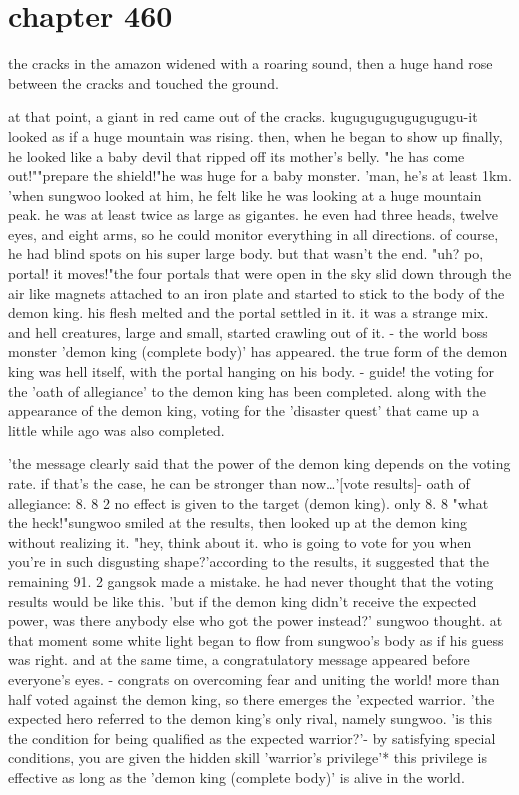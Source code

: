 \section{chapter 460}

the cracks in the amazon widened with a roaring sound, then a huge hand rose between the cracks and touched the ground.





at that point, a giant in red came out of the cracks.
kugugugugugugugugu-it looked as if a huge mountain was rising.
 then, when he began to show up finally, he looked like a baby devil that ripped off its mother's belly.
"he has come out!""prepare the shield!"he was huge for a baby monster.
'man, he's at least 1km.
'when sungwoo looked at him, he felt like he was looking at a huge mountain peak.
he was at least twice as large as gigantes.
 he even had three heads, twelve eyes, and eight arms, so he could monitor everything in all directions.
of course, he had blind spots on his super large body.
but that wasn't the end.
"uh? po, portal! it moves!"the four portals that were open in the sky slid down through the air like magnets attached to an iron plate and started to stick to the body of the demon king.
 his flesh melted and the portal settled in it.
 it was a strange mix.
and hell creatures, large and small, started crawling out of it.
- the world boss monster 'demon king (complete body)' has appeared.
the true form of the demon king was hell itself, with the portal hanging on his body.
- guide! the voting for the 'oath of allegiance' to the demon king has been completed.
along with the appearance of the demon king, voting for the 'disaster quest' that came up a little while ago was also completed.

'the message clearly said that the power of the demon king depends on the voting rate.
 if that's the case, he can be stronger than now…'[vote results]- oath of allegiance: 8.
8%
2%
 no effect is given to the target (demon king).
only 8.
8%
"what the heck!"sungwoo smiled at the results, then looked up at the demon king without realizing it.
"hey, think about it.
 who is going to vote for you when you're in such disgusting shape?'according to the results, it suggested that the remaining 91.
2%
gangsok made a mistake.
 he had never thought that the voting results would be like this.
'but if the demon king didn't receive the expected power, was there anybody else who got the power instead?' sungwoo thought.
at that moment some white light began to flow from sungwoo's body as if his guess was right.
 and at the same time, a congratulatory message appeared before everyone's eyes.
- congrats on overcoming fear and uniting the world! more than half voted against the demon king, so there emerges the 'expected warrior.
'the expected hero referred to the demon king's only rival, namely sungwoo.
'is this the condition for being qualified as the expected warrior?'- by satisfying special conditions, you are given the hidden skill 'warrior's privilege'* this privilege is effective as long as the 'demon king (complete body)' is alive in the world.

